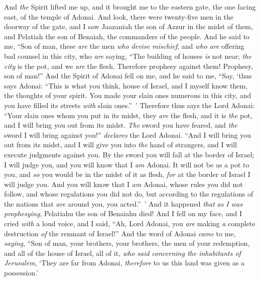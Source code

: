 \begin{biblechapter} %
 And \textit{the} Spirit lifted me up, and it brought me to the eastern gate, the one facing east, of the temple of Adonai. And look, there were twenty-five men in the doorway of the gate, and I saw Jaazaniah the son of Azzur in the midst of them, and Pelatiah the son of Benaiah, the commanders of the people.
\verse And he said to me, “Son of man, these \textit{are} the men \textit{who devise mischief}, and \textit{who are} offering bad counsel in this city,
\verse who \textit{are} saying, “The building of houses \textit{is} not near; \textit{the city} is the pot, and we \textit{are} the flesh.
\verse Therefore prophesy against them! Prophesy, son of man!”
\verse And the Spirit of Adonai fell on me, and he said to me, “Say, ‘thus says Adonai: “This is what you think, house of Israel, and I myself know them, the thoughts of your spirit.
\verse You made your slain ones numerous in this city, and you have filled its streets \textit{with} slain ones.” ’
\verse Therefore thus says the Lord Adonai: “Your slain ones whom you put in its midst, they \textit{are} the flesh, and it is \textit{the} pot, and I will bring you out from its midst.
\verse \textit{The} sword you have feared, and \textit{the} sword I will bring against you!” \textit{declares} the Lord Adonai.
\verse “And I will bring you out from its midst, and I will give you into \textit{the} hand of strangers, and I will execute judgments against you.
\verse By the sword you will fall at the border of Israel; I will judge you, and you will know that I \textit{am} Adonai.
\verse It will not be as a pot to you, and \textit{so} you would be in the midst of it as flesh, \textit{for} at the border of Israel I will judge you.
\verse And you will know that I \textit{am} Adonai, whose rules you did not follow, and whose regulations you did not do, but according to the regulations of the nations that \textit{are} around you, you acted.” ’
\verse And it happened \textit{that} \textit{as I was prophesying}, Pelatiahu the son of Benaiahu died! And I fell on my face, and I cried \textit{with} a loud voice, and I said, “Ah, Lord Adonai, you \textit{are} making \textit{a} complete destruction \textit{of} the remnant of Israel!”
\verse And the word of Adonai \textit{came} to me, \textit{saying},
\verse “Son of man, your brothers, your brothers, the men of your redemption, and all of the house of Israel, all of it, \textit{who said concerning the inhabitants of Jerusalem}, ‘They are far from Adonai, \textit{therefore} to us this land was given as a possession.’

\end{biblechapter}

